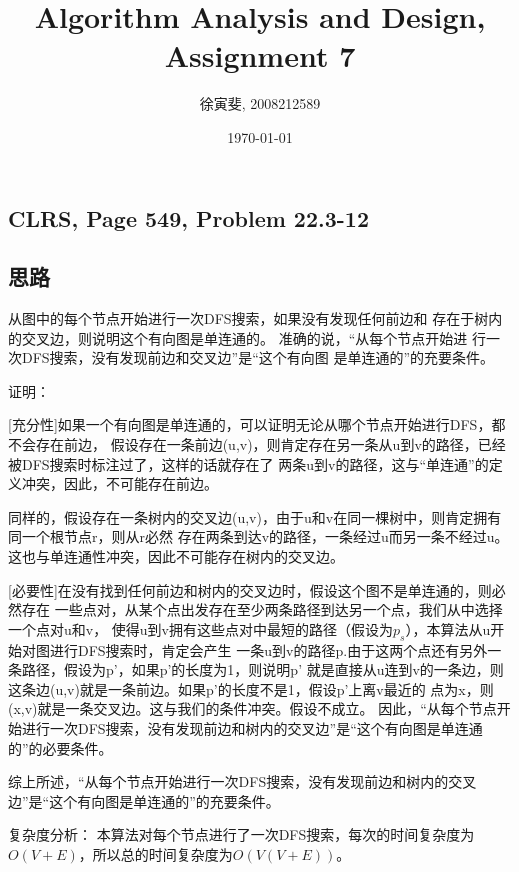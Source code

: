\documentclass{article}
\begin{document}
\begin{CJK}{UTF8}{gbsn}
\title{Algorithm Analysis and Design, Assignment 7}
\author{徐寅斐, 2008212589}
\date{\today}
\maketitle

\section{CLRS, Page 549, Problem 22.3-12}

\subsection*{思路}
从图中的每个节点开始进行一次DFS搜索，如果没有发现任何前边和
存在于树内的交叉边，则说明这个有向图是单连通的。 准确的说，``从每个节点开始进
行一次DFS搜索，没有发现前边和交叉边''是``这个有向图
是单连通的''的充要条件。\newline

证明：

[充分性]如果一个有向图是单连通的，可以证明无论从哪个节点开始进行DFS，都不会存在前边，
假设存在一条前边(u,v)，则肯定存在另一条从u到v的路径，已经被DFS搜索时标注过了，这样的话就存在了
两条u到v的路径，这与``单连通''的定义冲突，因此，不可能存在前边。

同样的，假设存在一条树内的交叉边(u,v)，由于u和v在同一棵树中，则肯定拥有同一个根节点r，则从r必然
存在两条到达v的路径，一条经过u而另一条不经过u。这也与单连通性冲突，因此不可能存在树内的交叉边。

[必要性]在没有找到任何前边和树内的交叉边时，假设这个图不是单连通的，则必然存在
一些点对，从某个点出发存在至少两条路径到达另一个点，我们从中选择一个点对u和v，
使得u到v拥有这些点对中最短的路径（假设为$p_s$），本算法从u开始对图进行DFS搜索时，肯定会产生
一条u到v的路径p.由于这两个点还有另外一条路径，假设为p'，如果p'的长度为1，则说明p'
就是直接从u连到v的一条边，则这条边(u,v)就是一条前边。如果p'的长度不是1，假设p'上离v最近的
点为x，则(x,v)就是一条交叉边。这与我们的条件冲突。假设不成立。
因此，``从每个节点开始进行一次DFS搜索，没有发现前边和树内的交叉边''是``这个有向图是单连通的''的必要条件。

综上所述，``从每个节点开始进行一次DFS搜索，没有发现前边和树内的交叉边''是``这个有向图是单连通的''的充要条件。\newline

复杂度分析： 本算法对每个节点进行了一次DFS搜索，每次的时间复杂度为$O(V+E)$，所以总的时间复杂度为$O(V(V+E))$。


\end{CJK}
\end{document}
